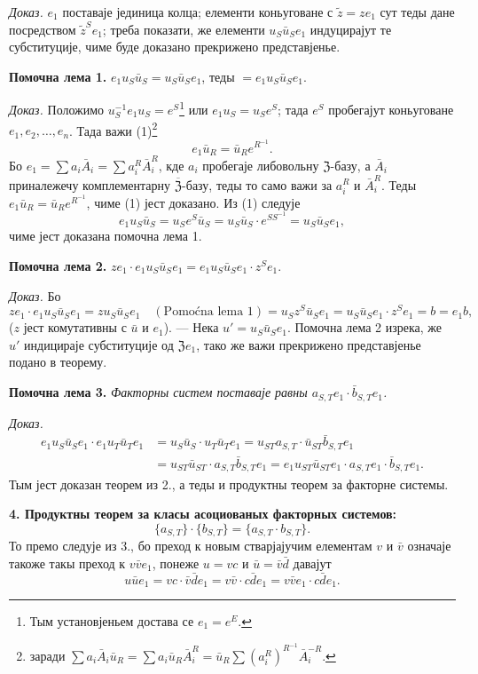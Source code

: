 \documentclass[11pt]{article}
\newcommand{\srcfn}[2]{\footnote{#2}}
\begin{document}
\noindent\emph{Доказ.} \(e_1\) поставаје јединица колца; елементи коньуговане с \(\tilde z=ze_1\) сут теды дане посредством \(\tilde z^Se_1\); треба показати, же елементи \(u_S\bar u_Se_1\) индуцирајут те субституције, чиме буде доказано прекрижено представјенье.

\noindent\textbf{Помочна лема 1.} \(e_1u_S\bar u_S=u_S\bar u_Se_1\), теды \(=e_1u_S\bar u_Se_1\).

\noindent\emph{Доказ.} Положимо \(u_S^{-1}e_1u_S=e^S\)\srcfn{1}{Тым установјеньем достава се \(e_1=e^E\).} или \(e_1u_S=u_Se^S\); тада \(e^S\) пробегајут коньуговане \(e_1,e_2,\ldots,e_n\). Тада важи (1)\srcfn{2}{заради \(\sum a_i\bar A_i\bar u_R=\sum a_i\bar u_R\bar A_i^R=\bar u_R\sum(a_i^R)^{R^{-1}}\bar A_i^{-R}\).}
\[
e_1\bar u_R=\bar u_Re^{R^{-1}}.
\]
Бо \(e_1=\sum a_i\bar A_i=\sum a_i^R\bar A_i^R\), кде \(a_i\) пробегаје либовольну \(\mathfrak Z\)-базу, а \(\bar A_i\) приналежечу комплементарну \(\overline{\mathfrak Z}\)-базу, теды то само важи за \(a_i^R\) и \(\bar A_i^R\). Теды \(e_1\bar u_R=\bar u_Re^{R^{-1}}\), чиме (1) јест доказано. Из (1) следује
\[
e_1u_S\bar u_S=u_Se^S\bar u_S=u_S\bar u_S\cdot e^{SS^{-1}}=u_S\bar u_Se_1,
\]
чиме јест доказана помочна лема 1.

\noindent\textbf{Помочна лема 2.} \(ze_1\cdot e_1u_S\bar u_Se_1=e_1u_S\bar u_Se_1\cdot z^Se_1\).

\noindent\emph{Доказ.} Бо
\[
ze_1\cdot e_1u_S\bar u_Se_1
=zu_S\bar u_Se_1\quad(\text{Pomoćna lema 1})
=u_Sz^S\bar u_Se_1
=u_S\bar u_Se_1\cdot z^Se_1
=b=e_1b,
\]
(\(z\) јест комутативны с \(\bar u\) и \(e_1\)). --- Нека \(u'=u_S\bar u_Se_1\). Помочна лема 2 изрека, же \(u'\) индицираје субституције од \(\mathfrak Ze_1\), тако же важи прекрижено представјенье подано в теорему.

\noindent\textbf{Помочна лема 3.} \emph{Факторны систем поставаје равны \(a_{S,T}e_1\cdot\bar b_{S,T}e_1\).}

\noindent\emph{Доказ.}
\[
\begin{aligned}
e_1u_S\bar u_Se_1\cdot e_1u_T\bar u_Te_1
&=u_S\bar u_S\cdot u_T\bar u_Te_1
 =u_{ST}a_{S,T}\cdot\bar u_{ST}\bar b_{S,T}e_1\\
&=u_{ST}\bar u_{ST}\cdot a_{S,T}\bar b_{S,T}e_1
 =e_1u_{ST}\bar u_{ST}e_1\cdot a_{S,T}e_1\cdot\bar b_{S,T}e_1.
\end{aligned}
\]
Тым јест доказан теорем из 2., а теды и продуктны теорем за факторне системы.

\noindent\textbf{4. Продуктны теорем за класы асоциованых факторных системов:}
\[
\{a_{S,T}\}\cdot\{b_{S,T}\}=\{a_{S,T}\cdot b_{S,T}\}.
\]
То премо следује из 3., бо преход к новым стварјајучим елементам \(v\) и \(\bar v\) означаје такоже такы преход к \(v\bar ve_1\), понеже \(u=vc\) и \(\bar u=\bar v\bar d\) давајут
\[
u\bar ue_1=vc\cdot\bar v\bar de_1=v\bar v\cdot c\bar de_1=v\bar ve_1\cdot c\bar de_1.
\]
\end{document}
